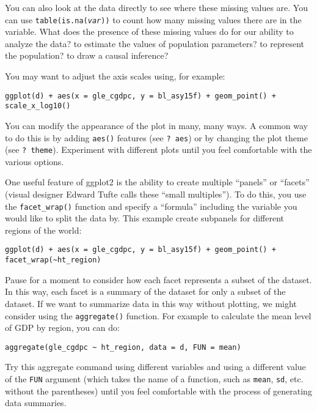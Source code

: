 \documentclass[a4paper,12pt]{article}
\begin{document}
\begin{enumerate*}
\noindent You can also look at the data directly to see where these missing values are. You can use \texttt{table(is.na(\textit{var}))} to count how many missing values there are in the variable. What does the presence of these missing values do for our ability to analyze the data? to estimate the values of population parameters? to represent the population? to draw a causal inference?

\item You may want to adjust the axis scales using, for example:

\begin{verbatim}
ggplot(d) + aes(x = gle_cgdpc, y = bl_asy15f) + geom_point() + scale_x_log10()
\end{verbatim}

\item You can modify the appearance of the plot in many, many ways. A common way to do this is by adding \texttt{aes()} features (see \texttt{? aes}) or by changing the plot theme (see \texttt{? theme}). Experiment with different plots until you feel comfortable with the various options.

\item One useful feature of ggplot2 is the ability to create multiple ``panels'' or ``facets'' (visual designer Edward Tufte calls these ``small multiples''). To do this, you use the \texttt{facet\_wrap()} function and specify a ``formula'' including the variable you would like to split the data by. This example create subpanels for different regions of the world:

\begin{verbatim}
ggplot(d) + aes(x = gle_cgdpc, y = bl_asy15f) + geom_point() + facet_wrap(~ht_region)
\end{verbatim}

\item Pause for a moment to consider how each facet represents a subset of the dataset. In this way, each facet is a summary of the dataset for only a subset of the dataset. If we want to summarize data in this way without plotting, we might consider using the \texttt{aggregate()} function. For example to calculate the mean level of GDP by region, you can do:

\begin{verbatim}
aggregate(gle_cgdpc ~ ht_region, data = d, FUN = mean)
\end{verbatim}

\noindent Try this aggregate command using different variables and using a different value of the \texttt{FUN} argument (which takes the name of a function, such as \texttt{mean}, \texttt{sd}, etc. without the parentheses) until you feel comfortable with the process of generating data summaries.



\end{enumerate*}
\end{document}
